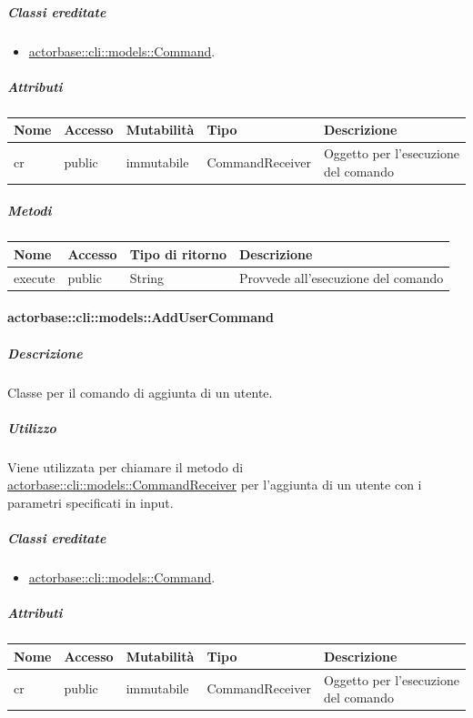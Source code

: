 \documentclass{scalatekids-article}
\begin{document}
\subparagraph{Classi ereditate}

\begin{itemize}
\item \hyperref[sec:actorbase::cli::models::Command]{actorbase::cli::models::Command}.
\end{itemize}

\subparagraph{Attributi}

\begin{tabular}{| p{1cm} | p{1.5cm} | p{2cm} | p{4cm} | p{8.5cm} |}
  \hline
  Nome & Accesso & Mutabilità & Tipo & Descrizione\\
  \hline
  cr & public & immutabile & CommandReceiver & Oggetto per l'esecuzione del comando\\
  \hline
\end{tabular}

\subparagraph{Metodi}

\begin{tabular}{| l | l | l | l |}
  \hline
  Nome & Accesso & Tipo di ritorno & Descrizione\\
  \hline
  execute & public & String & Provvede all'esecuzione del comando\\
  \hline
\end{tabular}

\paragraph{actorbase::cli::models::AddUserCommand}
\label{sec:actorbase::cli::models::AddUserCommand}

\subparagraph{Descrizione}
Classe per il comando di aggiunta di un utente.

\subparagraph{Utilizzo}

Viene utilizzata per chiamare il metodo di
\hyperref[sec:actorbase::cli::models::CommandReceiver]{actorbase::cli::models::CommandReceiver} per l'aggiunta di un utente con i
parametri specificati in input.

\subparagraph{Classi ereditate}

\begin{itemize}
\item \hyperref[sec:actorbase::cli::models::Command]{actorbase::cli::models::Command}.
\end{itemize}

\subparagraph{Attributi}

\begin{tabular}{| p{1cm} | p{1.5cm} | p{2cm} | p{4cm} | p{8.5cm} |}
  \hline
  Nome & Accesso & Mutabilità & Tipo & Descrizione\\
  \hline
  cr & public & immutabile & CommandReceiver & Oggetto per l'esecuzione del comando\\
  \hline
\end{tabular}
\end{document}

